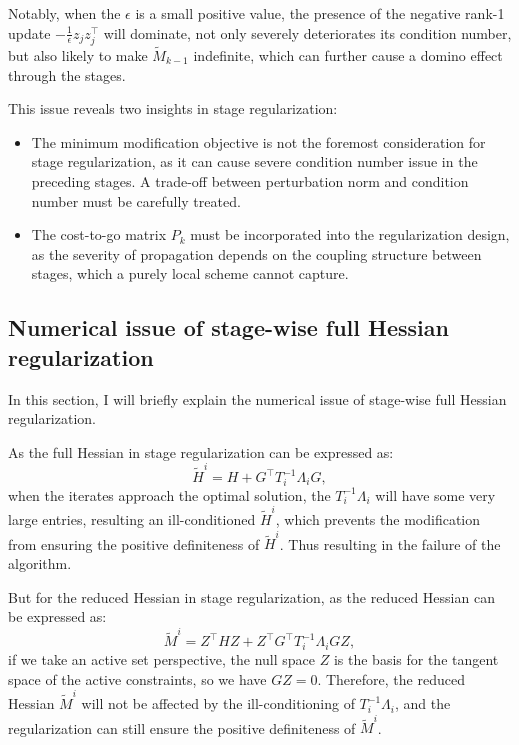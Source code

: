 \documentclass[conference]{IEEEtran}
\theoremstyle{plain}
\begin{document}
Notably, when the $\epsilon$ is a small positive value,
the presence of the negative rank-1 update $-\frac{1}{\epsilon} z_j z_j^\top$ will dominate, not only severely deteriorates its condition number,
but also likely to make $\tilde{M}_{k-1}$ indefinite, which can further cause a domino effect through the stages.

This issue reveals two insights in stage regularization:
\begin{itemize}
    \item The minimum modification objective \cite{fangModifiedCholeskyAlgorithms2007} is not the foremost consideration for stage regularization, 
    as it can cause severe condition number issue in the preceding stages.
    A trade-off between perturbation norm and condition number must be carefully treated.
    \item The cost-to-go matrix $P_k$ must be incorporated into the regularization design, 
    as the severity of propagation depends on the coupling structure between stages, 
    which a purely local scheme cannot capture.
\end{itemize}

\subsection{Numerical issue of stage-wise full Hessian regularization}
In this section, I will briefly explain the numerical issue of stage-wise full Hessian regularization.

As the full Hessian in stage regularization can be expressed as:
\begin{equation}
    \tilde{H}^i = H + G^\top T_i^{-1} \Lambda_i G,
\end{equation}
when the iterates approach the optimal solution, the $T_i^{-1} \Lambda_i$ will have some very large entries,
resulting an ill-conditioned $\tilde{H}^i$, which prevents the modification from ensuring the positive definiteness of $\tilde{H}^i$.
Thus resulting in the failure of the algorithm.

But for the reduced Hessian in stage regularization, as the reduced Hessian can be expressed as:
\begin{equation}
    \tilde{M}^i = Z^\top H Z + Z^\top G^\top T_i^{-1} \Lambda_i G Z,
\end{equation}
if we take an active set perspective, the null space $Z$ is the basis for the tangent space of the active constraints, so we have $G Z = 0$.
Therefore, the reduced Hessian $\tilde{M}^i$ will not be affected by the ill-conditioning of $T_i^{-1} \Lambda_i$,
and the regularization can still ensure the positive definiteness of $\tilde{M}^i$.
\end{document}
